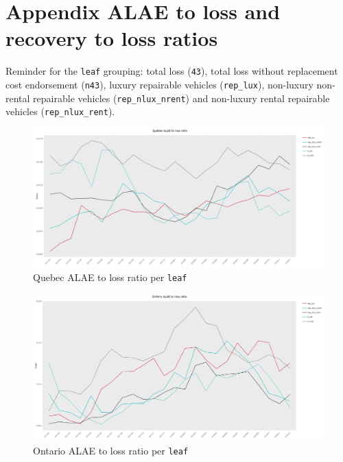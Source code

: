 \section{Appendix ALAE to loss and recovery to loss ratios}
Reminder for the \texttt{leaf} grouping:  total loss (\texttt{43}), total loss without replacement cost endorsement (\texttt{n43}), luxury repairable vehicles (\texttt{rep\_lux}), non-luxury non-rental repairable vehicles (\texttt{rep\_nlux\_nrent}) and non-luxury rental repairable vehicles (\texttt{rep\_nlux\_rent}).

\begin{figure}[H]
	\begin{center}
		\includegraphics[scale=0.14]{Graphiques/QC_ALAE_loss} 
		\renewcommand{\figurename}{Figure}
		\caption{Quebec ALAE to loss ratio per \texttt{leaf}}\label{Fig_QC_ALAE_loss}
	\end{center}
\end{figure}

\begin{figure}[H]
	\begin{center}
		\includegraphics[scale=0.14]{Graphiques/ON_ALAE_loss} 
		\renewcommand{\figurename}{Figure}
		\caption{Ontario ALAE to loss ratio per \texttt{leaf}}\label{Fig_ON_ALAE_loss}
	\end{center}
\end{figure}

